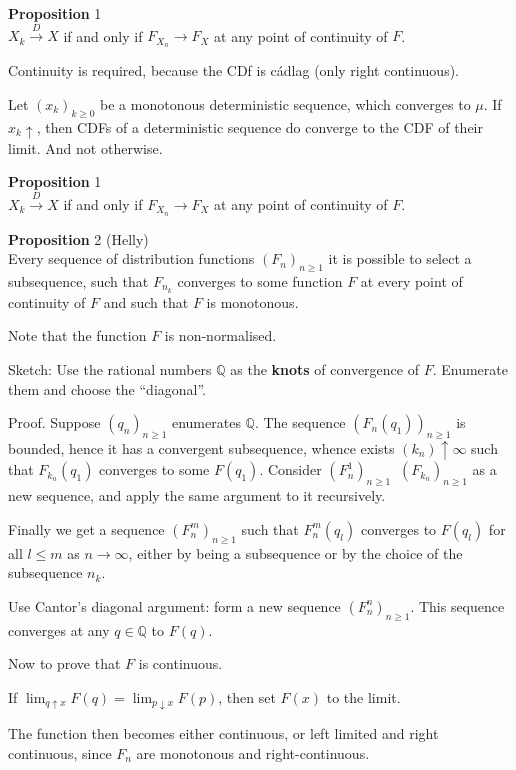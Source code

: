 \documentclass[a4paper]{article}
\newcommand{\brac}[1]{{\left ( #1 \right )}}
\newcommand{\defn}{\mathop{\overset{\Delta}{=}}\nolimits}
\begin{document}
\noindent \textbf{Proposition} 1\hfill \\
$X_k\overset{D}{\to}X$ if and only if $F_{X_n}\to F_X$ at any point of continuity of $F$.

Continuity is required, because the CDf is c\'adlag (only right continuous).

Let $\brac{x_k}_{k\geq0}$ be a monotonous deterministic sequence, which converges to $\mu$.
If $x_k\uparrow$, then CDFs of a deterministic sequence do converge to the CDF of their limit. And not otherwise.

\noindent \textbf{Proposition} 1\hfill \\
$X_k\overset{D}{\to}X$ if and only if $F_{X_n}\to F_X$ at any point of continuity of $F$.

\noindent \textbf{Proposition} 2 (Helly)\hfill \\
Every sequence of distribution functions $\brac{F_n}_{n\geq1}$ it is possible to select a subsequence, such that $F_{n_k}$ converges to some function $F$ at every point of continuity of $F$ and such that $F$ is monotonous.

Note that the function $F$ is non-normalised.

Sketch:
Use the rational numbers $\mathbb{Q}$ as the \textbf{knots} of convergence of $F$. Enumerate them and choose the ``diagonal''.

Proof. Suppose $\brac{q_n}_{n\geq 1}$ enumerates $\mathbb{Q}$.
The sequence $\brac{F_n(q_1)}_{n\geq1}$ is bounded, hence it has a convergent subsequence, whence exists $\brac{k_n}\uparrow\infty$ such that $F_{k_n}(q_1)$ converges to some $F(q_1)$.
Consider $\brac{F^1_n}_{n\geq 1}\defn\brac{F_{k_n}}_{n\geq1}$ as a new sequence, and apply the same argument to it recursively.

Finally we get a sequence $\brac{F^m_n}_{n\geq1}$ such that $F^m_n(q_l)$ converges to $F(q_l)$ for all $l\leq m$ as $n\to \infty$, either by being a subsequence or by the choice of the subsequence $n_k$.

Use Cantor's diagonal argument: form a new sequence $\brac{F^n_n}_{n\geq1}$. This sequence converges at any $q\in\mathbb{Q}$ to $F(q)$.

Now to prove that $F$ is continuous.

If $\lim_{q\uparrow x}F(q) = \lim_{p\downarrow x}F(p)$, then set $F(x)$ to the limit.

The function then becomes either continuous, or left limited and right continuous, since $F_n$ are monotonous and right-continuous.
\end{document}
